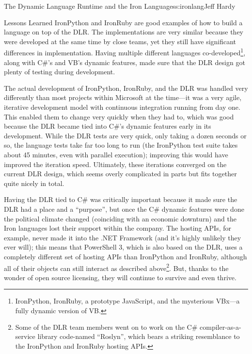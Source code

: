 \begin{aosachapter}{The Dynamic Language Runtime and the Iron Languages}{s:ironlang}{Jeff Hardy}
\begin{aosasect1}{Lessons Learned}
IronPython and IronRuby are good examples of how to build a language on top of
the DLR. The implementations are very similar because they were developed at
the same time by close teams, yet they still have significant differences in
implementation. Having multiple different languages
co-developed\footnote{IronPython, IronRuby, a prototype JavaScript, and the
mysterious VBx---a fully dynamic version of VB.}, along with C\#'s and VB's
dynamic features, made sure that the DLR design got plenty of testing during
development.

The actual development of IronPython, IronRuby, and the DLR was handled very
differently than most projects within Microsoft at the time---it was a very
agile, iterative development model with continuous integration running from day
one. This enabled them to change very quickly when they had to, which was good
because the DLR became tied into C\#'s dynamic features early in its
development. While the DLR tests are very quick, only taking a dozen seconds or
so, the language tests take far too long to run (the IronPython test suite
takes about 45 minutes, even with parallel execution); improving this would
have improved the iteration speed. Ultimately, these iterations converged on
the current DLR design, which seems overly complicated in parts but fits
together quite nicely in total.

Having the DLR tied to C\# was critically important because it made sure the
DLR had a place and a ``purpose'', but once the C\# dynamic features were done
the political climate changed (coinciding with an economic downturn) and the
Iron languages lost their support within the company. The hosting APIs, for
example, never made it into the .NET Framework (and it's highly unlikely they
ever will); this means that PowerShell 3, which is also based on the DLR, uses
a completely different set of hosting APIs than IronPython and IronRuby,
although all of their objects can still interact as described
above\footnote{Some of the DLR team members went on to work on the C\#
compiler-as-a-service library code-named ``Roslyn'', which bears a striking
resemblance to the IronPython and IronRuby hosting APIs.}. But, thanks to the
wonder of open source licensing, they will continue to survive and even thrive.

\end{aosasect1}

\end{aosachapter}
